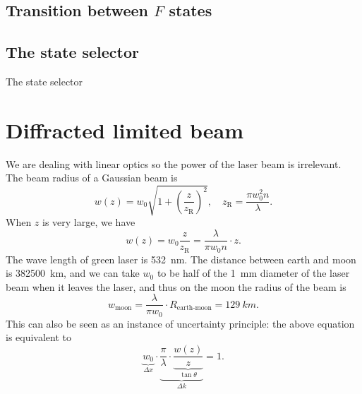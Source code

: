\documentclass[hyperref, a4paper]{article}
\begin{document}
\subsection{Transition between $F$ states}



\subsection{The state selector}

The state selector 

\section{Diffracted limited beam}

We are dealing with linear optics 
so the power of the laser beam is irrelevant.
The beam radius of a Gaussian beam is 
\begin{equation}
    w(z) = w_0 \sqrt{1 + \left(\frac{z}{z_{\text{R}}}\right)^2}, \quad 
    z_{\text{R}} = \frac{\pi w_0^2 n}{\lambda}.
\end{equation}
When $z$ is very large, we have 
\begin{equation}
    w(z) = w_0 \frac{z}{z_{\text{R}}} = \frac{\lambda}{\pi w_0 n} \cdot z.
\end{equation}
The wave length of green laser is \SI{532}{nm}.
The distance between earth and moon is \SI{382500}{km},
and we can take $w_0$ to be half of the \SI{1}{mm} diameter of the laser beam 
when it leaves the laser,
and thus on the moon the radius of the beam is 
\[
    w_{\text{moon}} = \frac{\lambda}{\pi w_0} \cdot R_{\text{earth-moon}} = 
    \SI{129}{km}.
\]
This can also be seen as an instance of uncertainty principle: 
the above equation is equivalent to 
\begin{equation}
    \underbrace{w_0}_{\Delta x} \cdot 
    \underbrace{\frac{\pi}{\lambda} \cdot \underbrace{\frac{w(z)}{z}}_{\tan \theta}}_{\Delta k} = 1.
\end{equation}
\end{document}
